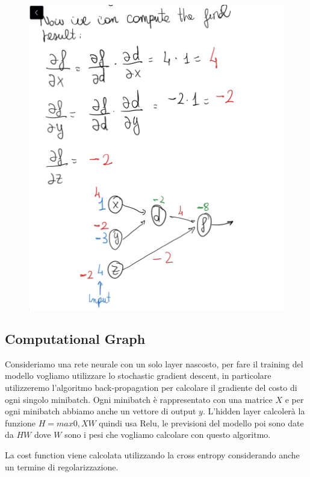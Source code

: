 \documentclass[14pt]{extreport}
\begin{document}
\begin{figure}[H]
\centering
\includegraphics[width=\linewidth]{394.jpeg}
\end{figure}

\subsection{Computational Graph}

Consideriamo una rete neurale con un solo layer nascosto, per fare il training del modello vogliamo utilizzare lo stochastic gradient descent, in
particolare utilizzeremo l'algoritmo back-propagation per calcolare il gradiente del costo di ogni singolo minibatch. Ogni minibatch è rappresentato
con una matrice $X$ e per ogni minibatch abbiamo anche un vettore di output $y$. L'hidden layer calcolerà la funzione $H = max{0, XW}$ quindi usa
Relu, le previsioni del modello poi sono date da $HW$ dove $W$ sono i pesi che vogliamo calcolare con questo algoritmo.

La cost function viene calcolata utilizzando la cross entropy considerando anche un termine di regolarizzazione.
\end{document}
